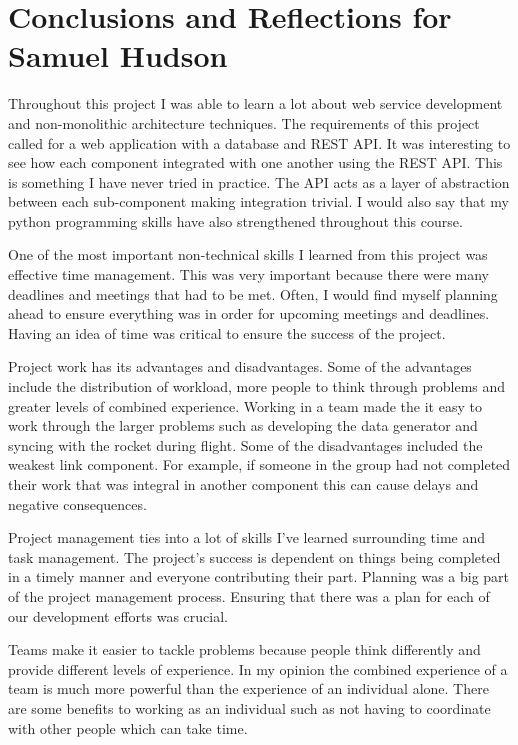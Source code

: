 \documentclass[onecolumn, draftclsnofoot,10pt, compsoc]{IEEEtran}
\begin{document}
\section{Conclusions and Reflections for Samuel Hudson}
Throughout this project I was able to learn a lot about web service development and non-monolithic architecture techniques. The requirements of this project called for a web application with a database and REST API. It was interesting to see how each component integrated with one another using the REST API. This is something I have never tried in practice. The API acts as a layer of abstraction between each sub-component making integration trivial. I would also say that my python programming skills have also strengthened throughout this course. \par
One of the most important non-technical skills I learned from this project was effective time management. This was very important because there were many deadlines and meetings that had to be met. Often, I would find myself planning ahead to ensure everything was in order for upcoming meetings and deadlines. Having an idea of time was critical to ensure the success of the project. \par
Project work has its advantages and disadvantages. Some of the advantages include the distribution of workload, more people to think through problems and greater levels of combined experience. Working in a team made the it easy to work through the larger problems such as developing the data generator and syncing with the rocket during flight. Some of the disadvantages included the weakest link component. For example, if someone in the group had not completed their work that was integral in another component this can cause delays and negative consequences. \par
Project management ties into a lot of skills I’ve learned surrounding time and task management. The project’s success is dependent on things being completed in a timely manner and everyone contributing their part. Planning was a big part of the project management process. Ensuring that there was a plan for each of our development efforts was crucial. \par
Teams make it easier to tackle problems because people think differently and provide different levels of experience. In my opinion the combined experience of a team is much more powerful than the experience of an individual alone. There are some benefits to working as an individual such as not having to coordinate with other people which can take time. \par
\end{document}
